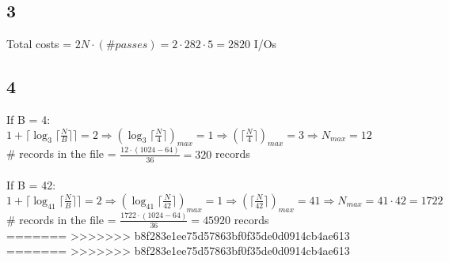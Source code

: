 \documentclass[12pt]{article}
\begin{document}
	\subsection*{3}
	Total costs = $2N\cdot (\# passes) = 2\cdot 282\cdot 5 = 2820$ I/Os\\
	
	\subsection*{4}
	If B = 4:\\
	$1+ \lceil \log_{3}{ \lceil\frac{N}{B}\rceil }\rceil=2\Rightarrow (\log_3{\lceil\frac{N}{4}\rceil})_{max}=1\Rightarrow (\lceil\frac{N}{4}\rceil)_{max}=3 \Rightarrow N_{max}=12$\\
	\# records in the file = $\frac{12\cdot (1024-64)}{36}= 320$ records \\
	\\
	If B = 42:\\
	$1+ \lceil \log_{41}{ \lceil\frac{N}{B}\rceil }\rceil=2\Rightarrow (\log_41{\lceil\frac{N}{42}\rceil})_{max}=1\Rightarrow (\lceil\frac{N}{42}\rceil)_{max}=41 \Rightarrow N_{max}=41\cdot 42 = 1722$\\
	\# records in the file = $\frac{1722\cdot (1024-64)}{36}= 45920$ records \\
	
=======
>>>>>>> b8f283e1ee75d57863bf0f35de0d0914cb4ae613
=======
>>>>>>> b8f283e1ee75d57863bf0f35de0d0914cb4ae613
\end{document}
